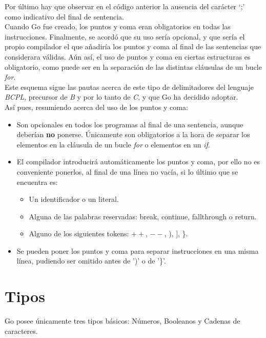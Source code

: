 Por último hay que observar en el código anterior la ausencia del carácter `;' como
indicativo del final de sentencia.\\

Cuando Go fue creado, los puntos y coma eran obligatorios en todas las
instrucciones. Finalmente, se acordó que su uso sería opcional, y que sería el
propio compilador el que añadiría los puntos y coma al final de las sentencias
que considerara válidas. Aún así, el uso de puntos y coma en ciertas estructuras
es obligatorio, como puede ser en la separación de las distintas cláusulas de un
bucle \emph{for}.\\

Este esquema sigue las pautas acerca de este tipo de delimitadores del lenguaje
\emph{BCPL}, precursor de \emph{B} y por lo tanto de \emph{C}, y que Go ha decidido
adoptar.\\

Así pues, resumiendo acerca del uso de los puntos y coma:

\begin{itemize}
	\item Son opcionales en todos los programas al final de una sentencia,
	aunque deberían \textbf{no} ponerse. Únicamente son obligatorios a la
	hora de separar los elementos en la cláusula de un bucle \emph{for}
	o elementos en un \emph{if}.
	\item El compilador introducirá automáticamente los puntos y coma, por ello
	no es conveniente ponerlos, al final de una línea no vacía, si lo último que
	se encuentra es:
		\begin{itemize}
			\item Un identificador o un literal.
			\item Alguna de las palabras reservadas: break, continue,
			fallthrough o return.
			\item Alguno de los siguientes tokens: $++$, $--$, ), ], \}.
		\end{itemize}
		\item Se pueden poner los puntos y coma para separar instrucciones en
		una misma línea, pudiendo ser omitido antes de ')' o de '\}'.
\end{itemize}

\section{Tipos}

Go posee únicamente tres tipos básicos: Números, Booleanos y Cadenas de
caracteres.

